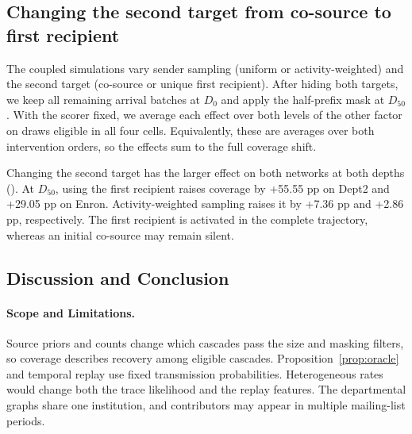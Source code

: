 \subsection{Changing the second target from co-source to first recipient}\label{sec:controlled_role}
The coupled simulations vary sender sampling (uniform or activity-weighted) and the second target (co-source or unique first recipient). After hiding both targets, we keep all remaining arrival batches at $D_0$ and apply the half-prefix mask at $D_{50}$. With the scorer fixed, we average each effect over both levels of the other factor on draws eligible in all four cells. Equivalently, these are averages over both intervention orders, so the effects sum to the full coverage shift.

Changing the second target has the larger effect on both networks at both depths (). At $D_{50}$, using the first recipient raises coverage by +55.55 pp on Dept2 and +29.05 pp on Enron. Activity-weighted sampling raises it by +7.36 pp and +2.86 pp, respectively. The first recipient is activated in the complete trajectory, whereas an initial co-source may remain silent.


\FloatBarrier

\begin{samepage}
\section{Discussion and Conclusion}
\paragraph{Scope and Limitations.}
Source priors and counts change which cascades pass the size and masking filters, so coverage describes recovery among eligible cascades. Proposition~\ref{prop:oracle} and temporal replay use fixed transmission probabilities. Heterogeneous rates would change both the trace likelihood and the replay features. The departmental graphs share one institution, and contributors may appear in multiple mailing-list periods.

\par
\end{samepage}
